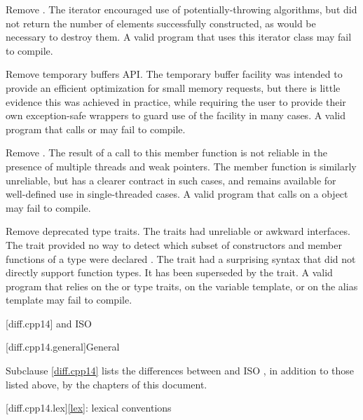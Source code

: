 \nodiffref
\change
Remove .
\rationale
The iterator encouraged use of potentially-throwing algorithms, but did
not return the number of elements successfully constructed,
as would be necessary to destroy them.
\effect
A valid \CppXVII{} program that uses this iterator class may fail to compile.

\nodiffref
\change
Remove temporary buffers API.
\rationale
The temporary buffer facility was intended to provide an efficient optimization
for small memory requests, but there is little evidence this was achieved in
practice, while requiring the user to provide their own exception-safe wrappers
to guard use of the facility in many cases.
\effect
A valid \CppXVII{} program that calls  or
 may fail to compile.

\nodiffref
\change
Remove .
\rationale
The result of a call to this member function is not reliable in the presence of
multiple threads and weak pointers. The member function  is
similarly unreliable, but has a clearer contract in such cases, and remains
available for well-defined use in single-threaded cases.
\effect
A valid \CppXVII{} program that calls  on a 
object may fail to compile.

\change
Remove deprecated type traits.
\rationale
The traits had unreliable or awkward interfaces. The 
trait provided no way to detect which subset of constructors and member
functions of a type were declared . The 
trait had a surprising syntax that did not directly support function types.
It has been superseded by the  trait.
\effect
A valid \CppXVII{} program that relies on the  or
 type traits, on the  variable template,
or on the  alias template may fail to compile.

[diff.cpp14]{\Cpp{} and ISO \CppXIV{}}

[diff.cpp14.general]{General}

\pnum
{}%
Subclause \ref{diff.cpp14} lists the differences between \Cpp{} and
ISO \CppXIV{},
in addition to those listed above,
by the chapters of this document.

[diff.cpp14.lex]{\ref{lex}: lexical conventions}

